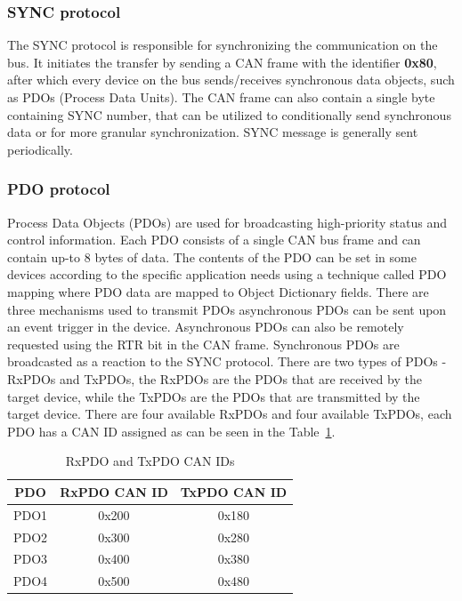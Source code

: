 \subsubsection{SYNC protocol}
The SYNC protocol is responsible for synchronizing the communication on the bus.
It initiates the transfer by sending a CAN frame with the identifier \textbf{0x80}, after which every device on the bus sends/receives synchronous data objects, such as PDOs (Process Data Units).
The CAN frame can also contain a single byte containing SYNC number, that can be utilized to conditionally send synchronous data or for more granular synchronization\cite{cia}.
SYNC message is generally sent periodically.

\subsubsection{PDO protocol}
Process Data Objects (PDOs) are used for broadcasting high-priority status and control information\cite{cia}.
Each PDO consists of a single CAN bus frame and can contain up-to 8 bytes of data.
The contents of the PDO can be set in some devices according to the specific application needs using a technique called PDO mapping where PDO data are mapped to Object Dictionary fields.
There are three mechanisms used to transmit PDOs asynchronous PDOs can be sent upon an event trigger in the device.
Asynchronous PDOs can also be remotely requested using the RTR bit in the CAN frame.
Synchronous PDOs are broadcasted as a reaction to the SYNC protocol.
There are two types of PDOs - RxPDOs and TxPDOs, the RxPDOs are the PDOs that are received by the target device, while the TxPDOs are the PDOs that are transmitted by the target device.
There are four available RxPDOs and four available TxPDOs, each PDO has a CAN ID assigned as can be seen in the Table~\ref{tab:pdo}.

\begin{table}[H]
    \centering
    \begin{tabular}{ |c|c|c| }
        \hline
        PDO & RxPDO CAN ID & TxPDO CAN ID \\
        \hline
        \hline
        PDO1 & 0x200 & 0x180 \\
        \hline
        PDO2 & 0x300 & 0x280 \\
        \hline
        PDO3 & 0x400 & 0x380 \\
        \hline
        PDO4 & 0x500 & 0x480 \\
        \hline
    \end{tabular}
    \caption{RxPDO and TxPDO CAN IDs\cite{wiki_canopen}}
    \label{tab:pdo}
\end{table}

